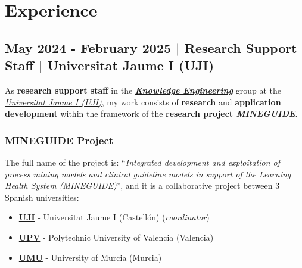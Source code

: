 \documentclass[letterpaper, 12pt, dvipsnames]{article}
\newcommand{\upvName}{Polytechnic University of Valencia}
\newcommand{\upv}{UPV}
\newcommand{\upvUrl}{https://www.upv.es/en}
\newcommand{\ujiFull}{{\ujiName} ({\uji})}
\newcommand{\ujiName}{Universitat Jaume I}
\newcommand{\uji}{UJI}
\newcommand{\ujiUrl}{https://www.uji.es/upo/rest/publicacion/idioma/en?urlRedirect=https://www.uji.es/&url=/}
\newcommand{\ujiGroup}{Knowledge Engineering}
\newcommand{\ujiGroupUrl}{https://www.uji.es/upo/rest/publicacion/idioma/en?urlRedirect=https://www.uji.es/serveis/ocit/base/grupsinvestigacio/detall/&url=/serveis/ocit/base/grupsinvestigacio/detall&codi=158}
\begin{document}
\begin{adjustwidth}{-1.5cm}{}
\end{adjustwidth}

\pagebreak

\section*{Experience}

\subsection*{May 2024 - February 2025 | Research Support Staff | {\ujiFull}}

As \textbf{research support staff} in the \emph{\textbf{\href{\ujiGroupUrl}{\ujiGroup}}} group at the \emph{\href{\ujiUrl}{\ujiFull}}, my work consists of \textbf{research} and \textbf{application development} within the framework of the \textbf{research project \emph{MINEGUIDE}}.

\subsubsection*{MINEGUIDE Project}

The full name of the project is: ``\emph{Integrated development and exploitation of process mining models and clinical guideline models in support of the Learning Health System (MINEGUIDE)}'', and it is a collaborative project between 3 Spanish universities:
\begin{itemize}
    \item \textbf{\href{\ujiUrl}{\uji}} - {\ujiName} (Castellón) (\emph{coordinator})
    \item \textbf{\href{\upvUrl}{\upv}} - {\upvName} (Valencia)
    \item \textbf{\href{https://www.um.es/}{UMU}} - University of Murcia (Murcia) 
\end{itemize}
\end{document}
